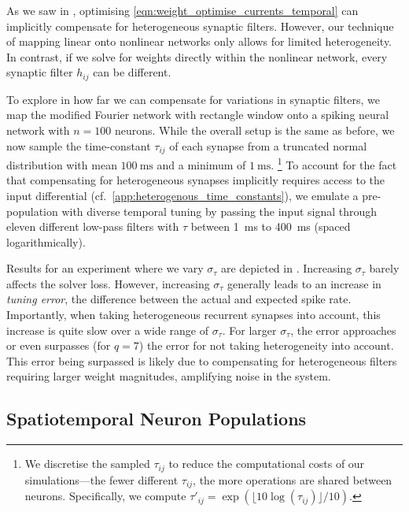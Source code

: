 As we saw in , optimising \cref{eqn:weight_optimise_currents_temporal} can implicitly compensate for heterogeneous synaptic filters.
However, our technique of mapping linear onto nonlinear networks only allows for limited heterogeneity.
In contrast, if we solve for weights directly within the nonlinear network, every synaptic filter $h_{ij}$ can be different.

To explore in how far we can compensate for variations in synaptic filters, we map the modified Fourier network with rectangle window onto a spiking neural network with $n = 100$ neurons.
While the overall setup is the same as before, we now sample the time-constant $\tau_{ij}$ of each synapse from a truncated normal distribution with mean $\SI{100}{\milli\second}$ and a minimum of $\SI{1}{\milli\second}$.%
\footnote{We discretise the sampled $\tau_{ij}$ to reduce the computational costs of our simulations---the fewer different $\tau_{ij}$, the more operations are shared between neurons.
Specifically, we compute $\tau'_{ij} = \exp(\lfloor 10 \log(\tau_{ij}) \rfloor / 10)$.
}
To account for the fact that compensating for heterogeneous synapses implicitly requires access to the input differential (cf.~\cref{app:heterogenous_time_constants}), we emulate a pre-population with diverse temporal tuning by passing the input signal through eleven different low-pass filters with $\tau$ between \SI{1}{\milli\second} to \SI{400}{\milli\second} (spaced logarithmically).

Results for an experiment where we vary $\sigma_\tau$ are depicted in .
Increasing $\sigma_\tau$ barely affects the solver loss.
However, increasing $\sigma_\tau$ generally leads to an increase in \emph{tuning error}, the difference between the actual and expected spike rate.
Importantly, when taking heterogeneous recurrent synapses into account, this increase is quite slow over a wide range of $\sigma_\tau$.
For larger $\sigma_\tau$, the error approaches or even surpasses (for $q = 7$) the error for not taking heterogeneity into account.
This error being surpassed is likely due to compensating for heterogeneous filters requiring larger weight magnitudes, amplifying noise in the system.

\subsection{Spatiotemporal Neuron Populations}
\label{sec:spatiotemporal}

